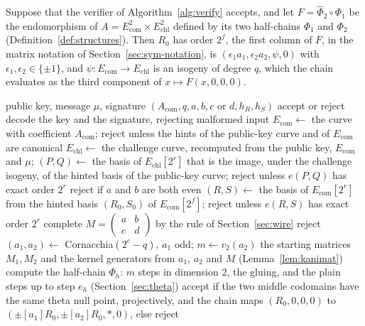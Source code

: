 \documentclass[version=preprint]{iacrcc}
\newcommand{\Ecom}{E_{\mathrm{com}}}
\newcommand{\Echl}{E_{\mathrm{chl}}}
\begin{document}
    \begin{proposition}
        \label{prop:soundness}
        Suppose that the verifier of Algorithm~\ref{alg:verify} accepts, and
        let $F = \widehat\Phi_2 \circ \Phi_1$ be the endomorphism of $A =
        \Ecom^2 \times \Echl^2$ defined by its two half-chains $\Phi_1$ and
        $\Phi_2$ (Definition~\ref{def:structures}). Then $R_0$ has order $2^f$,
        the first column of $F$, in the matrix notation of
        Section~\ref{sec:sym-notation}, is $(\epsilon_1 a_1, \epsilon_2 a_2,
        \psi, 0)$ with $\epsilon_1, \epsilon_2 \in \{\pm 1\}$, and $\psi \colon
        \Ecom \to \Echl$ is an isogeny of degree $q$, which the chain evaluates
        as the third component of $x \mapsto F(x, 0, 0, 0)$.
    \end{proposition}

    \begin{algorithm}[t]
        \caption{Verification of a dimension-4 signature.}
        \label{alg:verify}
        \begin{algorithmic}[1]
            \Require public key, message $\mu$, signature $(A_{\mathrm{com}}, q, a,
            b, c \text{ or } d, h_R, h_S)$
            \Ensure accept or reject
            \State decode the key and the signature, rejecting malformed input
            \State $\Ecom \gets$ the curve with coefficient $A_{\mathrm{com}}$;
            reject unless the hints of the public-key curve and of $\Ecom$
            are canonical
            \State $\Echl \gets$ the challenge curve, recomputed from the public
            key, $\Ecom$ and $\mu$; $(P, Q) \gets$ the basis of $\Echl[2^r]$ that
            is the image, under the challenge isogeny, of the hinted basis of
            the public-key curve; reject unless $e(P, Q)$ has exact order $2^r$
            \State reject if $a$ and $b$ are both even
            \State $(R, S) \gets$ the basis of $\Ecom[2^r]$ from the hinted
            basis $(R_0, S_0)$ of $\Ecom[2^f]$; reject unless $e(R, S)$ has
            exact order $2^r$
            \State complete $M = \left(\begin{smallmatrix} a & b \\ c & d
            \end{smallmatrix}\right)$ by the rule of Section~\ref{sec:wire}
                \State reject
            \EndIf
            \State $(a_1, a_2) \gets$ Cornacchia$(2^e - q)$, $a_1$ odd; $m \gets
            v_2(a_2)$
            \State the starting matrices $M_1, M_2$ and the kernel generators
            from $a_1$, $a_2$ and $M$ (Lemma~\ref{lem:kanimat})
                \State compute the half-chain $\Phi_h$: $m$ steps in dimension 2,
                the gluing, and the plain steps up to step $e_h$
                (Section~\ref{sec:theta})
            \EndFor
            \State \Return accept if the two middle codomains have the same
            theta null point, projectively, and the chain maps $(R_0, 0, 0, 0)$ to
            $(\pm[a_1]R_0, \pm[a_2]R_0, \ast, 0)$, else reject
        \end{algorithmic}
    \end{algorithm}
\end{document}
